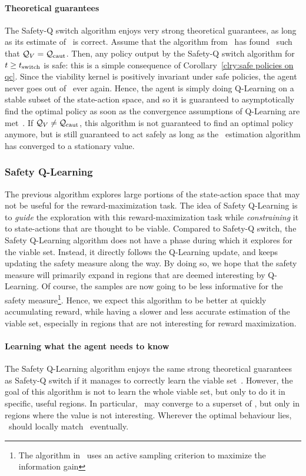 \paragraph{Theoretical guarantees} The Safety-Q switch algorithm enjoys very strong theoretical guarantees, as long as its estimate of \QV~is correct. Assume that the algorithm from~\cite{heim2020learnable} has found \Qcaut~such that $\mathcal{Q}_{V} = \mathcal{Q}_\text{caut}$. Then, any policy output by the Safety-Q switch algorithm for $t \geq t_\text{switch}$ is safe: this is a simple consequence of Corollary~\ref{clry:safe policies on qc}. Since the viability kernel is positively invariant under safe policies, the agent never goes out of \QV~ever again. Hence, the agent is simply doing Q-Learning on a stable subset of the state-action space, and so it is guaranteed to asymptotically find the optimal policy as soon as the convergence assumptions of Q-Learning are met~\cite{sutton2018reinforcement}. If $\mathcal{Q}_{V}\neq\mathcal{Q}_\text{caut}$, this algorithm is not guaranteed to find an optimal policy anymore, but is still guaranteed to act safely as long as the \Qcaut~estimation algorithm has converged to a stationary value.

\subsubsection{Safety Q-Learning}
The previous algorithm explores large portions of the state-action space that may not be useful for the reward-maximization task. The idea of Safety Q-Learning is to\emph{ guide} the exploration with this reward-maximization task while\emph{ constraining} it to state-actions that are thought to be viable. Compared to Safety-Q switch, the Safety Q-Learning algorithm does not have a phase during which it explores for the viable set. Instead, it directly follows the Q-Learning update, and keeps updating the safety measure along the way. By doing so, we hope that the safety measure will primarily expand in regions that are deemed interesting by Q-Learning. Of course, the samples are now going to be less informative for the safety measure\footnote{The algorithm in~\cite{heim2020learnable} uses an active sampling criterion to maximize the information gain}. Hence, we expect this algorithm to be better at quickly accumulating reward, while having a slower and less accurate estimation of the viable set, especially in regions that are not interesting for reward maximization.%
\paragraph{Learning what the agent needs to know}The Safety Q-Learning algorithm enjoys the same strong theoretical guarantees as Safety-Q switch if it manages to correctly learn the viable set~\QV. However, the goal of this algorithm is not to learn the whole viable set, but only to do it in specific, useful regions. In particular, \Qcaut~may converge to a superset of \QV, but only in regions where the value is not interesting. Wherever the optimal behaviour lies, \Qcaut~should locally match \QV~eventually.

